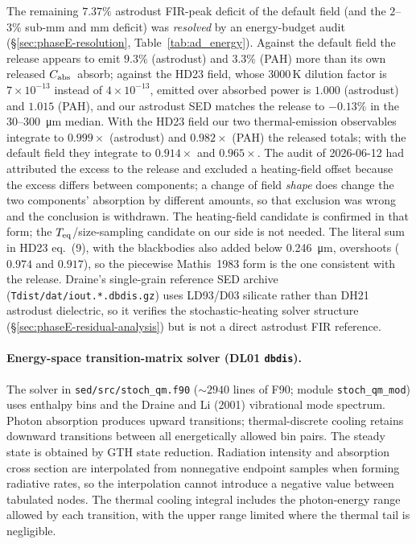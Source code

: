 \documentclass{my_memo}
\newcommand{\Cabs}{\ensuremath{C_{\rm abs}}}
\newcommand{\Teq}{\ensuremath{T_{\rm eq}}}
\begin{document}
The remaining $7.37\%$ astrodust FIR-peak deficit of the default field
(and the $2$--$3\%$ sub-mm and mm deficit) was \emph{resolved} by an
energy-budget audit (\S\ref{sec:phaseE-resolution},
Table~\ref{tab:ad_energy}). Against the default field the release
appears to emit $9.3\%$ (astrodust) and $3.3\%$ (PAH) more than its own
released \Cabs\ absorb; against the HD23 field, whose 3000\,K dilution
factor is $7\times10^{-13}$ instead of $4\times10^{-13}$, emitted over
absorbed power is $1.000$ (astrodust) and $1.015$ (PAH), and our
astrodust SED matches the release to $-0.13\%$ in the
30--\SI{300}{\micro\meter} median. With the HD23 field our two
thermal-emission observables integrate to $0.999\times$ (astrodust) and
$0.982\times$ (PAH) the released totals; with the default field they
integrate to $0.914\times$ and $0.965\times$. The audit of 2026-06-12
had attributed the excess to the release and excluded a heating-field
offset because the excess differs between components; a change of
field \emph{shape} does change the two components' absorption by
different amounts, so that exclusion was wrong and the conclusion is
withdrawn. The heating-field candidate is confirmed in that form; the
\Teq/size-sampling candidate on our side is not needed. The literal sum
in HD23 eq.~(9), with the blackbodies also added below
\SI{0.246}{\micro\meter}, overshoots ($0.974$ and $0.917$), so the
piecewise Mathis~1983 form is the one consistent with the release.
Draine's single-grain reference SED archive
(\texttt{Tdist/dat/iout.*.dbdis.gz}) uses LD93/D03 silicate rather than
DH21 astrodust dielectric, so it verifies the stochastic-heating solver
structure (\S\ref{sec:phaseE-residual-analysis}) but is not a direct
astrodust FIR reference.

\paragraph{Energy-space transition-matrix solver (DL01 \texttt{dbdis}).}
The solver in \texttt{sed/src/stoch\_qm.f90} ($\sim 2940$ lines of F90;
module \texttt{stoch\_qm\_mod}) uses enthalpy bins and the
Draine and Li (2001) vibrational mode spectrum. Photon absorption
produces upward transitions; thermal-discrete cooling retains downward
transitions between all energetically allowed bin pairs. The steady
state is obtained by GTH state reduction. Radiation intensity and
absorption cross section are interpolated from nonnegative endpoint
samples when forming radiative rates, so the interpolation cannot
introduce a negative value between tabulated nodes. The thermal
cooling integral includes the photon-energy range allowed by each
transition, with the upper range limited where the thermal tail is
negligible.
\end{document}
